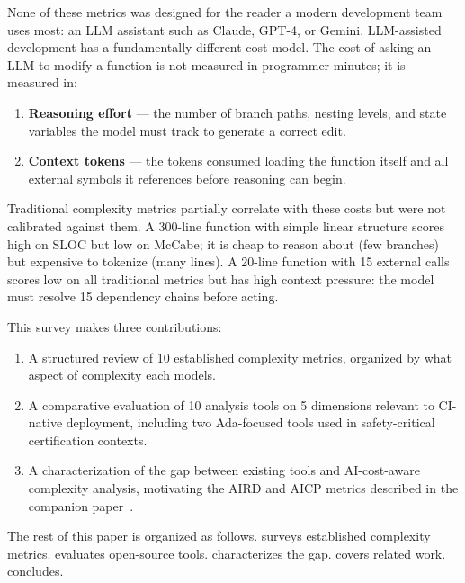 \documentclass[10pt,twocolumn,letterpaper]{article}
\begin{document}
None of these metrics was designed for the reader a modern development
team uses most: an LLM assistant such as Claude, GPT-4, or Gemini.
LLM-assisted development has a fundamentally different cost model.  The
cost of asking an LLM to modify a function is not measured in programmer
minutes; it is measured in:

\begin{enumerate}
    \item \textbf{Reasoning effort} --- the number of branch paths, nesting
        levels, and state variables the model must track to generate a
        correct edit.
    \item \textbf{Context tokens} --- the tokens consumed loading the
        function itself and all external symbols it references before
        reasoning can begin.
\end{enumerate}

Traditional complexity metrics partially correlate with these costs but
were not calibrated against them.  A 300-line function with simple linear
structure scores high on SLOC but low on McCabe; it is cheap to reason
about (few branches) but expensive to tokenize (many lines).  A 20-line
function with 15 external calls scores low on all traditional metrics
but has high context pressure: the model must resolve 15 dependency
chains before acting.

This survey makes three contributions:

\begin{enumerate}
    \item A structured review of 10 established complexity metrics,
        organized by what aspect of complexity each models.
    \item A comparative evaluation of 10 analysis tools on 5 dimensions
        relevant to CI-native deployment, including two Ada-focused tools
        used in safety-critical certification contexts.
    \item A characterization of the gap between existing tools and
        AI-cost-aware complexity analysis, motivating the AIRD and AICP
        metrics described in the companion paper~\cite{knots-aird}.
\end{enumerate}

The rest of this paper is organized as follows.
 surveys established complexity metrics.
 evaluates open-source tools.
 characterizes the gap.
 covers related work.
 concludes.
\end{document}
